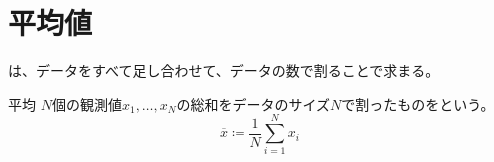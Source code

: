 \documentclass[../../../topic_probability-statistics]{subfiles}
\begin{document}
\section{平均値}

は、データをすべて足し合わせて、データの数で割ることで求まる。

\begin{definition}{平均}
  $N$個の観測値$x_1, \ldots, x_N$の総和をデータのサイズ$N$で割ったものをという。
  \begin{equation*}
    \overline{x} \coloneq \frac{1}{N} \sum_{i=1}^{N} x_i
  \end{equation*}
\end{definition}
\end{document}
